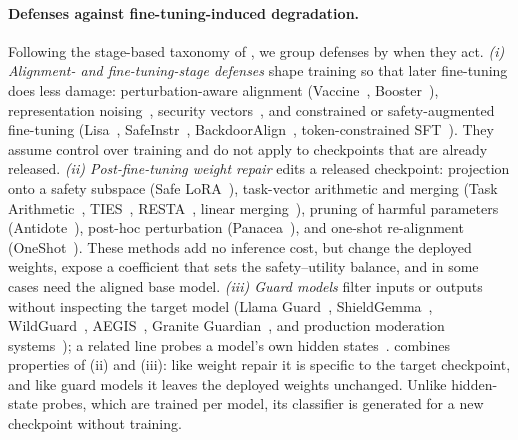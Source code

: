 \paragraph{Defenses against fine-tuning-induced degradation.}
Following the stage-based taxonomy of \citet{huang2024survey}, we group defenses by when they act. \emph{(i) Alignment- and fine-tuning-stage defenses} shape training so that later fine-tuning does less damage: perturbation-aware alignment (Vaccine~\citep{huang2024vaccine}, Booster~\citep{huang2024booster}), representation noising~\citep{rosati2024representation}, security vectors~\citep{zhou2024making}, and constrained or safety-augmented fine-tuning (Lisa~\citep{huang2024lisa}, SafeInstr~\citep{bianchi2024safetytuned}, BackdoorAlign~\citep{wang2024backdooralign}, token-constrained SFT~\citep{qi2025safety}). They assume control over training and do not apply to checkpoints that are already released. \emph{(ii) Post-fine-tuning weight repair} edits a released checkpoint: projection onto a safety subspace (Safe LoRA~\citep{hsu2024safe}), task-vector arithmetic and merging (Task Arithmetic~\citep{ilharco2023task}, TIES~\citep{yadav2023ties}, RESTA~\citep{bhardwaj2024resta}, linear merging~\citep{farn2025safeguard}), pruning of harmful parameters (Antidote~\citep{huang2025antidote}), post-hoc perturbation (Panacea~\citep{wang2025panacea}), and one-shot re-alignment (OneShot~\citep{zhang2026safety}). These methods add no inference cost, but change the deployed weights, expose a coefficient that sets the safety--utility balance, and in some cases need the aligned base model. \emph{(iii) Guard models} filter inputs or outputs without inspecting the target model (Llama Guard~\citep{inan2023llama}, ShieldGemma~\citep{zeng2024shieldgemma}, WildGuard~\citep{han2024wildguard}, AEGIS~\citep{ghosh2024aegis}, Granite Guardian~\citep{padhi2024granite}, and production moderation systems~\citep{markov2023moderation, lees2022newgeneration}); a related line probes a model's own hidden states~\citep{azaria2023internal, zou2023representation, arditi2024refusal, jiang2025hiddendetect}. \method{} combines properties of (ii) and (iii): like weight repair it is specific to the target checkpoint, and like guard models it leaves the deployed weights unchanged. Unlike hidden-state probes, which are trained per model, its classifier is generated for a new checkpoint without training.

